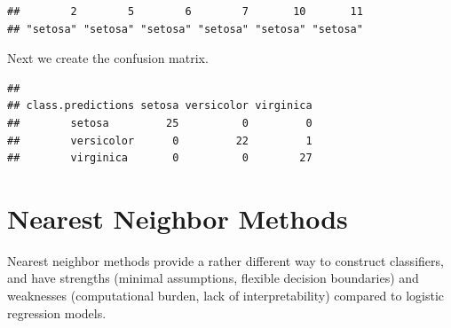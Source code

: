 \documentclass[
]{krantz}
\newenvironment{Shaded}{\begin{snugshade}}{\end{snugshade}}
\newcommand{\DecValTok}[1]{\textcolor[rgb]{0.00,0.00,0.81}{#1}}
\newcommand{\KeywordTok}[1]{\textcolor[rgb]{0.13,0.29,0.53}{\textbf{#1}}}
\newcommand{\NormalTok}[1]{#1}
\newcommand{\OperatorTok}[1]{\textcolor[rgb]{0.81,0.36,0.00}{\textbf{#1}}}
\newcommand{\StringTok}[1]{\textcolor[rgb]{0.31,0.60,0.02}{#1}}
\begin{document}
\begin{Shaded}
\end{Shaded}

\begin{verbatim}
##        2        5        6        7       10       11 
## "setosa" "setosa" "setosa" "setosa" "setosa" "setosa"
\end{verbatim}

Next we create the confusion matrix.

\begin{Shaded}
\end{Shaded}

\begin{verbatim}
##                  
## class.predictions setosa versicolor virginica
##        setosa         25          0         0
##        versicolor      0         22         1
##        virginica       0          0        27
\end{verbatim}

\hypertarget{nearest-neighbor-methods}{%
\section{Nearest Neighbor Methods}\label{nearest-neighbor-methods}}

Nearest neighbor methods provide a rather different way to construct classifiers, and have strengths (minimal assumptions, flexible decision boundaries) and weaknesses (computational burden, lack of interpretability) compared to logistic regression models.
\end{document}
